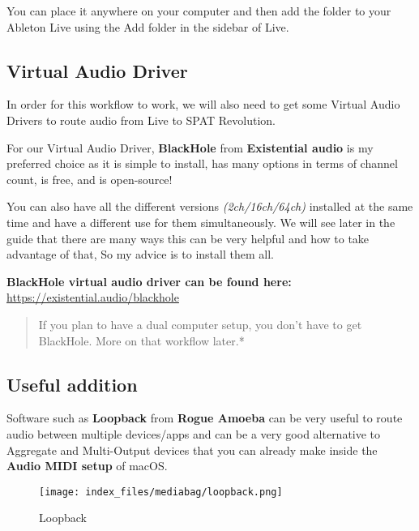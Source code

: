 \documentclass[
  letterpaper,
  DIV=11,
  numbers=noendperiod]{scrreport}
\begin{document}
You can place it anywhere on your computer and then add the folder to
your Ableton Live using the Add folder in the sidebar of Live.

\hypertarget{virtual-audio-driver}{%
\subsection{Virtual Audio Driver}\label{virtual-audio-driver}}

In order for this workflow to work, we will also need to get some
Virtual Audio Drivers to route audio from Live to SPAT Revolution.

For our Virtual Audio Driver, \textbf{BlackHole} from
\textbf{Existential audio} is my preferred choice as it is simple to
install, has many options in terms of channel count, is free, and is
open-source!

You can also have all the different versions \emph{(2ch/16ch/64ch)}
installed at the same time and have a different use for them
simultaneously. We will see later in the guide that there are many ways
this can be very helpful and how to take advantage of that, So my advice
is to install them all.

\textbf{BlackHole virtual audio driver can be found here:}
\url{https://existential.audio/blackhole}

\begin{quote}
If you plan to have a dual computer setup, you don't have to get
BlackHole. More on that workflow later.*
\end{quote}

\hypertarget{useful-addition}{%
\subsection{Useful addition}\label{useful-addition}}

Software such as \textbf{Loopback} from \textbf{Rogue Amoeba} can be
very useful to route audio between multiple devices/apps and can be a
very good alternative to Aggregate and Multi-Output devices that you can
already make inside the \textbf{Audio MIDI setup} of macOS.

\begin{figure}

{\centering \texttt{[image: index\_files/mediabag/loopback.png]}

}

\caption{Loopback}

\end{figure}
\end{document}
